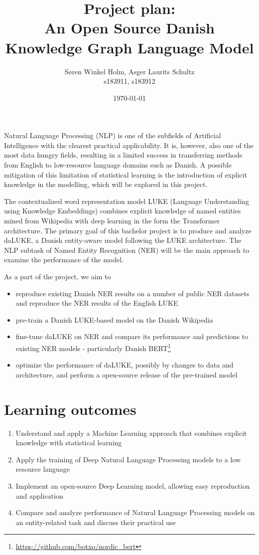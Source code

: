 \documentclass[12pt,fleqn]{article}
\title{
    Project plan:\\
    An Open Source Danish Knowledge Graph Language Model
}
\author{Søren Winkel Holm, Asger Laurits Schultz\\s183911, s183912}
\date{\today}
\begin{document}
\maketitle\noindent
Natural Language Processing (NLP) is one of the subfields of Artificial Intelligence with the clearest practical applicability.
It is, however, also one of the most data hungry fields, resulting in a limited success in transferring methods from English to low-resource language domains such as Danish.
A possible mitigation of this limitation of statistical learning is the introduction of explicit knowledge in the modelling, which will be explored in this project.

The contextualized word representation model LUKE (Language Understanding using Knowledge Embeddings) combines explicit knowledge of named entities mined from Wikipedia with deep learning in the form the Transformer architecture. \cite{transformer}
The primary goal of this bachelor project is to produce and analyze daLUKE, a Danish entity-aware model following the LUKE architecture.
The NLP subtask of Named Entity Recognition (NER) will be the main approach to examine the performance of the model.

As a part of the project, we aim to
\begin{itemize}
    \item reproduce existing Danish NER results on a number of public NER datasets and reproduce the NER results of the English LUKE
    \item pre-train a Danish LUKE-based model on the Danish Wikipedia
    \item fine-tune daLUKE on NER and compare its performance and predictions to existing NER models - particularly Danish BERT\footnote{\url{https://github.com/botxo/nordic\_bert}}
    \item optimize the performance of daLUKE, possibly by changes to data and architecture, and perform a open-source release of the pre-trained model
\end{itemize}

\section*{Learning outcomes}%
\begin{enumerate}
    \item Understand and apply a Machine Learning approach that combines explicit knowledge with statistical learning
    \item Apply the training of Deep Natural Language Processing models to a low resource language
    \item Implement an open-source Deep Learning model, allowing easy reproduction and application
    \item Compare and analyze performance of Natural Language Processing models on an entity-related task and discuss their practical use
\end{enumerate}
\end{document}
